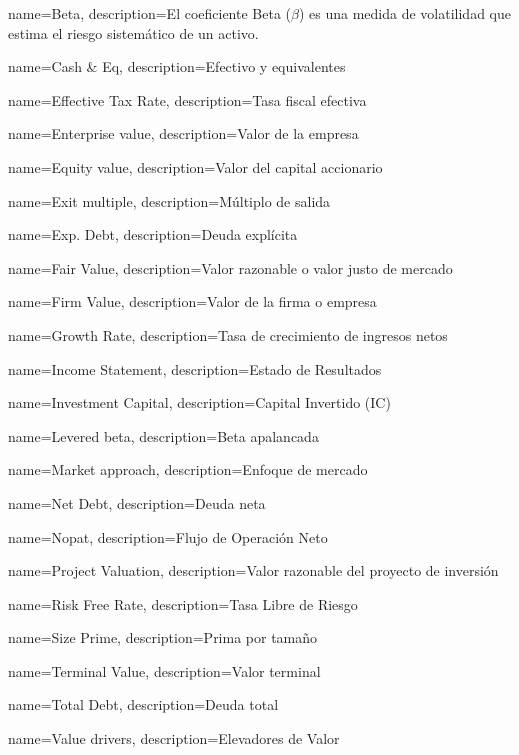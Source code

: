 {
        name=Beta,
        description={El coeficiente Beta ($\beta$)} es una medida de volatilidad que estima el riesgo sistem\'atico de un activo.
}

{
        name=Cash \& Eq,
        description={Efectivo y equivalentes}
}

{
        name=Effective Tax Rate,
        description={Tasa fiscal efectiva}
}

{
        name=Enterprise value,
        description={Valor de la empresa}
}

{
        name=Equity value,
        description={Valor del capital accionario}
}

{
        name=Exit multiple,
        description={M\'ultiplo de salida}
}

{
        name=Exp. Debt,
        description={Deuda expl\'icita}
}

{
        name=Fair Value,
        description={Valor razonable o valor justo de mercado}
}

{
        name=Firm Value,
        description={Valor de la firma o empresa}
}

{
        name=Growth Rate,
        description={Tasa de crecimiento de ingresos netos}
}

{
        name=Income Statement,
        description={Estado de Resultados}
}

{
        name=Investment Capital,
        description={Capital Invertido (IC)}
}

{
        name=Levered beta,
        description={Beta apalancada}
}

{
        name=Market approach,
        description={Enfoque de mercado}
}

{
        name=Net Debt,
        description={Deuda neta}
}

{
        name=Nopat,
        description={Flujo de Operaci\'on Neto}
}

{
        name=Project Valuation,
        description={Valor razonable del proyecto de inversi\'on}
}

{
        name=Risk Free Rate,
        description={Tasa Libre de Riesgo}
}

{
        name=Size Prime,
        description={Prima por tama\~no}
}

{
        name=Terminal Value,
        description={Valor terminal}
}

{
        name=Total Debt,
        description={Deuda total}
}

{
        name=Value drivers,
        description={Elevadores de Valor}
}